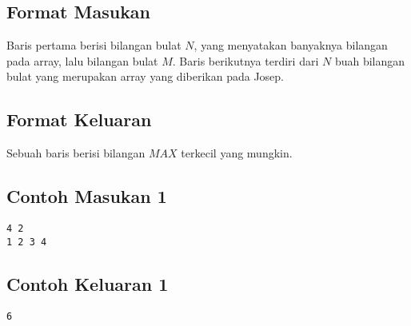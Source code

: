\documentclass{article}
\begin{document}

\subsection*{Format Masukan}


Baris pertama berisi bilangan bulat $N$, yang menyatakan banyaknya bilangan pada array, lalu bilangan bulat $M$.
Baris berikutnya terdiri dari $N$ buah bilangan bulat yang merupakan array yang diberikan pada Josep.

\subsection*{Format Keluaran}
Sebuah baris berisi bilangan $MAX$ terkecil yang mungkin.
\\

\begin{multicols}{2}
\subsection*{Contoh Masukan 1}
\begin{lstlisting}
4 2
1 2 3 4
\end{lstlisting}
\columnbreak
\subsection*{Contoh Keluaran 1}
\begin{lstlisting}
6
\end{lstlisting}
\vfill
\null
\end{multicols}



\pagebreak
\end{document}

